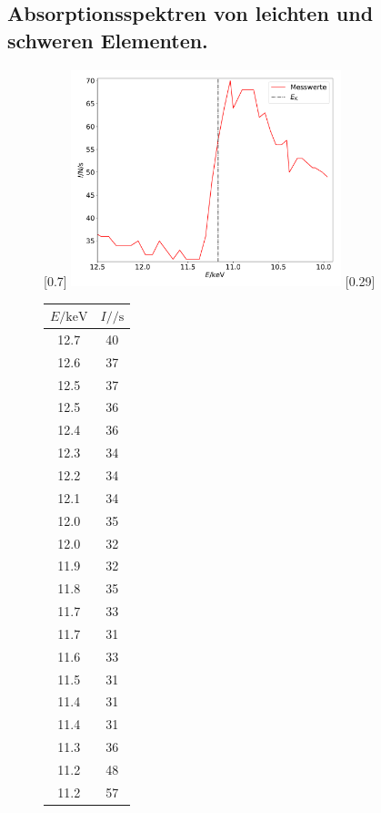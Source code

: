 \subsection{Absorptionsspektren von leichten und schweren Elementen.}
\begin{figure}
  \centering
  [0.7\textwidth]{
  \includegraphics[width=0.7\textwidth]{germanium.pdf}
  }
  \hfill
  [0.29\textwidth]{
  \begin{tabular}{c c}
    \toprule
    $E / \si{\kilo\electronvolt}$ & $I / \si{\per\second}$ \\
    \midrule
    12.7 & 40 \\
    12.6 & 37 \\
    12.5 & 37 \\
    12.5 & 36 \\
    12.4 & 36 \\
    12.3 & 34 \\
    12.2 & 34 \\
    12.1 & 34 \\
    12.0 & 35 \\
    12.0 & 32 \\
    11.9 & 32 \\
    11.8 & 35 \\
    11.7 & 33 \\
    11.7 & 31 \\
    11.6 & 33 \\
    11.5 & 31 \\
    11.4 & 31 \\
    11.4 & 31 \\
    11.3 & 36 \\
    11.2 & 48 \\
    11.2 & 57 \\

\end{tabular}}
\end{figure}
